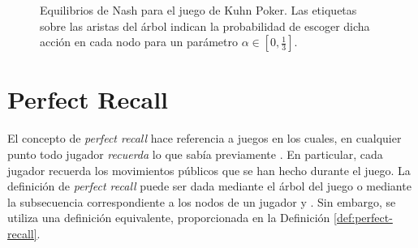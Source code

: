 \begin{figure}[h]
\begin{center}
\caption{Equilibrios de Nash para el juego de Kuhn Poker. Las etiquetas sobre las aristas del árbol indican la probabilidad de escoger dicha acción en cada nodo para un parámetro $\alpha \in \left[ 0,\frac{1}{3} \right]$.}
\label{fig:kuhn-poker-estrategias}
\end{center}
\end{figure}
\section{Perfect Recall}

El concepto de \textit{perfect recall} hace referencia a juegos en los cuales, en cualquier punto todo jugador \textit{recuerda} lo que sabía previamente \cite[p.~203]{bib:course-game-theory}. En particular, cada jugador recuerda los movimientos públicos que se han hecho durante el juego. La definición de \textit{perfect recall} puede ser dada mediante el árbol del juego \cite{bib:conceptos-basicos} o mediante la subsecuencia correspondiente a los nodos de un jugador \cite[p.~203]{bib:course-game-theory} y \cite[p.~44]{bib:handbook-blai}. Sin embargo, se utiliza una definición equivalente, proporcionada en la Definición \ref{def:perfect-recall}.

